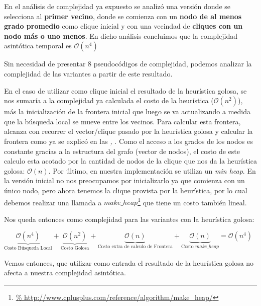 \par En el an\'alisis de complejidad ya expuesto se analiz\'o una versi\'on
    donde se selecciona al \textbf{primer vecino}, donde se comienza
    con un \textbf{nodo de al menos grado promedio} como clique inicial y
    con una vecindad de \textbf{cliques con un nodo m\'as o uno menos}. En
    dicho an\'alisis concluimos que la complejidad asint\'otica temporal
    es $\mathcal O(n^4)$

\par Sin necesidad de presentar 8 pseudoc\'odigos de complejidad, podemos
    analizar la complejidad de las variantes a partir de este resultado.

\par En el caso de utilizar como clique inicial el resultado de la
    heur\'istica golosa, se nos sumar\'ia a la complejidad ya calculada
    el costo de la heur\'istica ($\mathcal O(n^2)$), m\'as la inicializaci\'on
    de la frontera inicial que luego se va actualizando a medida que la b\'usqueda
    local se mueve entre los vecinos. Para calcular esta frontera, alcanza
    con recorrer el vector/clique pasado por la heur\'istica golosa y calcular
    la frontera como ya se explic\'o en las \emph{,
    }. Como el acceso a los grados de los nodos
    es constante gracias a la estructura del grafo (vector de nodos), el
    costo de este calculo esta acotado por la cantidad de nodos de la
    clique que nos da la heur\'istica golosa: $\mathcal O(n)$. Por \'ultimo,
    en nuestra implementaci\'on se utiliza un \emph{min heap}. En la versi\'on
    inicial no nos preocupamos por inicializarlo ya que comienza con un \'unico
    nodo, pero ahora tenemos la clique provista por la heur\'istica, por lo
    cual debemos realizar una llamada a $make\_heap$\footnote{\url{%
    http://www.cplusplus.com/reference/algorithm/make_heap/}} que tiene un
    costo tambi\'en lineal.

\par Nos queda entonces como complejidad para las variantes con la heur\'istica golosa:

\bigskip
\par $\underbrace{\mathcal O(n^4)}_{\text{Costo B\'usqueda Local}} +
    \underbrace{\mathcal O(n^2)}_{\text{Costo Golosa}} +
    \underbrace{\mathcal O(n)}_{\text{Costo extra de calculo de Frontera}} +
    \underbrace{\mathcal O(n)}_{\text{Costo $make\_heap$}}
    = \mathcal O(n^4)$
\bigskip

\par Vemos entonces, que utilizar como entrada el resultado de la heur\'istica
    golosa no afecta a nuestra complejidad asint\'otica.

